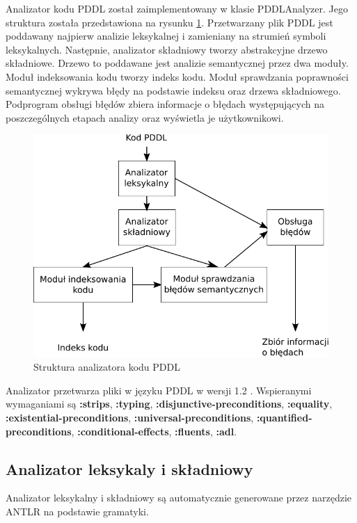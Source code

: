 Analizator kodu PDDL został zaimplementowany w klasie PDDLAnalyzer.
Jego struktura została przedstawiona na rysunku \ref{ana_structure}.
Przetwarzany plik PDDL jest poddawany najpierw analizie leksykalnej i zamieniany
na strumień symboli leksykalnych. Następnie, analizator składniowy tworzy abstrakcyjne
drzewo składniowe. Drzewo to poddawane jest analizie semantycznej przez dwa moduły.
Moduł indeksowania kodu tworzy indeks kodu.
Moduł sprawdzania poprawności semantycznej wykrywa błędy na podstawie indeksu oraz
drzewa składniowego. Podprogram obsługi błędów zbiera informacje o błędach występujących
na poszczególnych etapach analizy oraz wyświetla je użytkownikowi.

\begin{figure}[h]
  \centering
    \includegraphics{img/ana_structure.pdf}
    \caption{Struktura analizatora kodu PDDL}
    \label{ana_structure}
\end{figure}

\begin{sloppypar}
Analizator przetwarza pliki w języku PDDL w wersji 1.2 \cite{pddl}. Wspieranymi wymaganiami
są \textbf{:strips}, \textbf{:typing}, \textbf{:disjunctive-preconditions}, \textbf{:equality},
\textbf{:existential-preconditions}, \textbf{:universal-preconditions}, \textbf{:quantified-preconditions},
\textbf{:conditional-effects}, \textbf{:fluents}, \textbf{:adl}.
\end{sloppypar}

\subsection{Analizator leksykaly i składniowy}
Analizator leksykalny i składniowy są automatycznie generowane przez narzędzie ANTLR
na podstawie gramatyki. 

